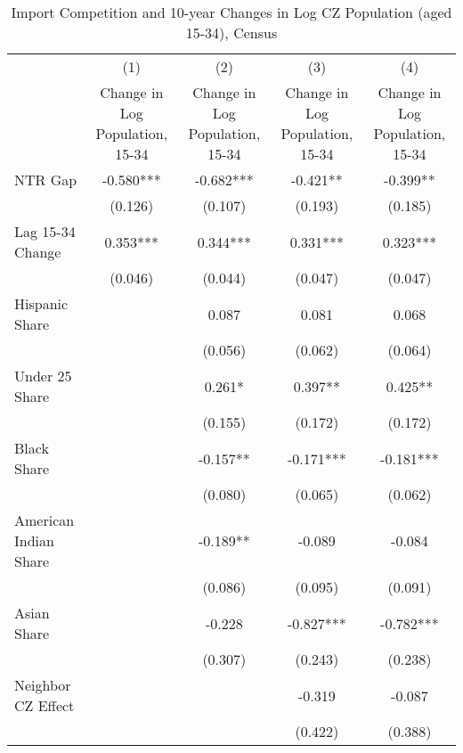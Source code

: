 \begin{table}[htbp]\centering
\def\sym#1{\ifmmode^{#1}\else\(^{#1}\)\fi}
\caption{Import Competition and 10-year Changes in Log CZ Population (aged 15-34), Census}
\begin{tabular}{l*{4}{c}}
\toprule
                    &\multicolumn{1}{c}{(1)}&\multicolumn{1}{c}{(2)}&\multicolumn{1}{c}{(3)}&\multicolumn{1}{c}{(4)}\\
                    &\multicolumn{1}{c}{Change in Log Population, 15-34}&\multicolumn{1}{c}{Change in Log Population, 15-34}&\multicolumn{1}{c}{Change in Log Population, 15-34}&\multicolumn{1}{c}{Change in Log Population, 15-34}\\
\midrule
NTR Gap             &   -0.580***&   -0.682***&   -0.421** &   -0.399** \\
                    &  (0.126)   &  (0.107)   &  (0.193)   &  (0.185)   \\
\addlinespace
Lag 15-34 Change    &    0.353***&    0.344***&    0.331***&    0.323***\\
                    &  (0.046)   &  (0.044)   &  (0.047)   &  (0.047)   \\
\addlinespace
Hispanic Share      &            &    0.087   &    0.081   &    0.068   \\
                    &            &  (0.056)   &  (0.062)   &  (0.064)   \\
\addlinespace
Under 25 Share      &            &    0.261*  &    0.397** &    0.425** \\
                    &            &  (0.155)   &  (0.172)   &  (0.172)   \\
\addlinespace
Black Share         &            &   -0.157** &   -0.171***&   -0.181***\\
                    &            &  (0.080)   &  (0.065)   &  (0.062)   \\
\addlinespace
American Indian Share&            &   -0.189** &   -0.089   &   -0.084   \\
                    &            &  (0.086)   &  (0.095)   &  (0.091)   \\
\addlinespace
Asian Share         &            &   -0.228   &   -0.827***&   -0.782***\\
                    &            &  (0.307)   &  (0.243)   &  (0.238)   \\
\addlinespace
Neighbor CZ Effect  &            &            &   -0.319   &   -0.087   \\
                    &            &            &  (0.422)   &  (0.388)   \\

\end{tabular}
\end{table}
